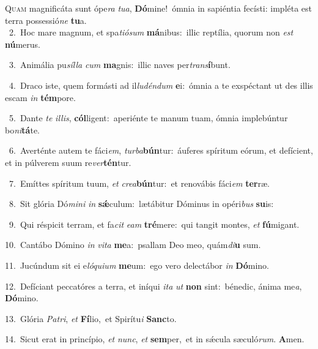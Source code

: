 \lettrine{\initial\textcolor{\initialcolor}{Q}}{uam} magnificáta sunt ópe\textit{ra} \textit{tu}\-\textit{a}, \textbf{Dó}\-mine!~\star ómnia in sapiéntia fecísti: impléta est terra possessió\textit{ne} \textbf{tu}\-a.\\
{\numbfont\textcolor{\numbcolor}{~2.}}~Hoc mare magnum, et spa\-\textit{ti}\-\textit{ó}\textit{sum} \textbf{má}\-nibus:~\star illic reptília, quorum non \textit{est} \textbf{nú}\-merus.\par
{\numbfont\textcolor{\numbcolor}{~3.}}~Animália pu\-\textit{síl}\-\textit{la} \textit{cum} \textbf{ma}\-gnis:~\star illic naves per\-\textit{trans}\-\textbf{í}bunt.\par
{\numbfont\textcolor{\numbcolor}{~4.}}~Draco iste, quem formásti ad il\-\textit{lu}\-\textit{dén}\textit{dum} \textbf{e}\-i:~\star ómnia a te exspéctant ut des illis escam \textit{in} \textbf{tém}\-pore.\par
{\numbfont\textcolor{\numbcolor}{~5.}}~Dante \textit{te} \textit{il}\-\textit{lis}, \textbf{cól}\-ligent:~\star aperiénte te manum tuam, ómnia implebúntur bo\-\textit{ni}\-\textbf{tá}te.\par
{\numbfont\textcolor{\numbcolor}{~6.}}~Averténte autem te fáci\-\textit{em}\-, \textit{tur}\-\textit{ba}\textbf{bún}tur:~\star áuferes spíritum eórum, et defícient, et in púlverem suum re\-\textit{ver}\-\textbf{tén}tur.\par
{\numbfont\textcolor{\numbcolor}{~7.}}~Emíttes spíritum tuum, \textit{et} \textit{cre}\-\textit{a}\textbf{bún}tur:~\star et renovábis fáci\textit{em} \textbf{ter}\-ræ.\par
{\numbfont\textcolor{\numbcolor}{~8.}}~Sit glória Dó\-\textit{mi}\-\textit{ni} \textit{in} \textbf{sǽ}\-culum:~\star lætábitur Dóminus in opéri\textit{bus} \textbf{su}\-is:\par
{\numbfont\textcolor{\numbcolor}{~9.}}~Qui réspicit terram, et fa\textit{cit} \textit{e}\-\textit{am} \textbf{tré}\-mere:~\star qui tangit montes, \textit{et} \textbf{fú}\-migant.\par
{\numbfont\textcolor{\numbcolor}{10.}}~Cantábo Dómino \textit{in} \textit{vi}\-\textit{ta} \textbf{me}\-a:~\star psallam Deo meo, quám\-\textit{di}\-\textbf{u} sum.\par
{\numbfont\textcolor{\numbcolor}{11.}}~Jucúndum sit ei e\-\textit{ló}\-\textit{qui}\textit{um} \textbf{me}\-um:~\star ego vero delectábor \textit{in} \textbf{Dó}\-mino.\par
{\numbfont\textcolor{\numbcolor}{12.}}~Defíciant peccatóres a terra, et iníqui \textit{i}\-\textit{ta} \textit{ut} \textbf{non} sint:~\star bénedic, ánima me\-\textit{a}\-, \textbf{Dó}\-mino.\par
{\numbfont\textcolor{\numbcolor}{13.}}~Glória \textit{Pa}\-\textit{tri}, \textit{et} \textbf{Fí}\-lio,~\star et Spirítu\textit{i} \textbf{Sanc}\-to.\par
{\numbfont\textcolor{\numbcolor}{14.}}~Sicut erat in princípio, \textit{et} \textit{nunc}\-, \textit{et} \textbf{sem}\-per,~\star et in sǽcula sæculó\-\textit{rum}\-. \textbf{A}\-men.\par
